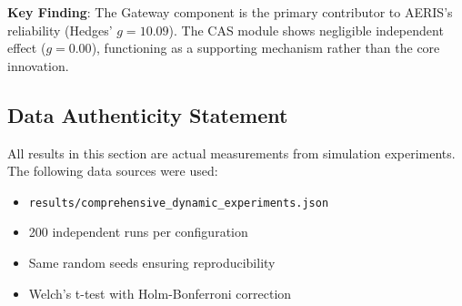 \textbf{Key Finding}: The Gateway component is the primary contributor to
AERIS's reliability (Hedges' $g = 10.09$). The CAS module shows negligible
independent effect ($g = 0.00$), functioning as a supporting mechanism
rather than the core innovation.

\subsection{Data Authenticity Statement}

All results in this section are actual measurements from simulation experiments.
The following data sources were used:
\begin{itemize}
    \item \texttt{results/comprehensive\_dynamic\_experiments.json}
    \item 200 independent runs per configuration
    \item Same random seeds ensuring reproducibility
    \item Welch's t-test with Holm-Bonferroni correction
\end{itemize}
